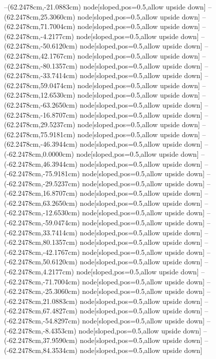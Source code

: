 --(62.2478cm,-21.0883cm) node[sloped,pos=0.5,allow upside down]{\ArrowIn}
--(62.2478cm,25.3060cm) node[sloped,pos=0.5,allow upside down]{\ArrowIn}
--(62.2478cm,71.7004cm) node[sloped,pos=0.5,allow upside down]{\ArrowIn}
--(62.2478cm,-4.2177cm) node[sloped,pos=0.5,allow upside down]{\ArrowIn}
--(62.2478cm,-50.6120cm) node[sloped,pos=0.5,allow upside down]{\ArrowIn}
--(62.2478cm,42.1767cm) node[sloped,pos=0.5,allow upside down]{\ArrowIn}
--(62.2478cm,-80.1357cm) node[sloped,pos=0.5,allow upside down]{\ArrowIn}
--(62.2478cm,-33.7414cm) node[sloped,pos=0.5,allow upside down]{\ArrowIn}
--(62.2478cm,59.0474cm) node[sloped,pos=0.5,allow upside down]{\ArrowIn}
--(62.2478cm,12.6530cm) node[sloped,pos=0.5,allow upside down]{\ArrowIn}
--(62.2478cm,-63.2650cm) node[sloped,pos=0.5,allow upside down]{\ArrowIn}
--(62.2478cm,-16.8707cm) node[sloped,pos=0.5,allow upside down]{\ArrowIn}
--(62.2478cm,29.5237cm) node[sloped,pos=0.5,allow upside down]{\ArrowIn}
--(62.2478cm,75.9181cm) node[sloped,pos=0.5,allow upside down]{\ArrowIn}
--(62.2478cm,-46.3944cm) node[sloped,pos=0.5,allow upside down]{\ArrowIn}
--(-62.2478cm,0.0000cm) node[sloped,pos=0.5,allow upside down]{\ArrowIn}
--(-62.2478cm,46.3944cm) node[sloped,pos=0.5,allow upside down]{\ArrowIn}
--(-62.2478cm,-75.9181cm) node[sloped,pos=0.5,allow upside down]{\ArrowIn}
--(-62.2478cm,-29.5237cm) node[sloped,pos=0.5,allow upside down]{\ArrowIn}
--(-62.2478cm,16.8707cm) node[sloped,pos=0.5,allow upside down]{\ArrowIn}
--(-62.2478cm,63.2650cm) node[sloped,pos=0.5,allow upside down]{\ArrowIn}
--(-62.2478cm,-12.6530cm) node[sloped,pos=0.5,allow upside down]{\ArrowIn}
--(-62.2478cm,-59.0474cm) node[sloped,pos=0.5,allow upside down]{\ArrowIn}
--(-62.2478cm,33.7414cm) node[sloped,pos=0.5,allow upside down]{\ArrowIn}
--(-62.2478cm,80.1357cm) node[sloped,pos=0.5,allow upside down]{\ArrowIn}
--(-62.2478cm,-42.1767cm) node[sloped,pos=0.5,allow upside down]{\ArrowIn}
--(-62.2478cm,50.6120cm) node[sloped,pos=0.5,allow upside down]{\ArrowIn}
--(-62.2478cm,4.2177cm) node[sloped,pos=0.5,allow upside down]{\ArrowIn}
--(-62.2478cm,-71.7004cm) node[sloped,pos=0.5,allow upside down]{\ArrowIn}
--(-62.2478cm,-25.3060cm) node[sloped,pos=0.5,allow upside down]{\ArrowIn}
--(-62.2478cm,21.0883cm) node[sloped,pos=0.5,allow upside down]{\ArrowIn}
--(-62.2478cm,67.4827cm) node[sloped,pos=0.5,allow upside down]{\ArrowIn}
--(-62.2478cm,-54.8297cm) node[sloped,pos=0.5,allow upside down]{\ArrowIn}
--(-62.2478cm,-8.4353cm) node[sloped,pos=0.5,allow upside down]{\ArrowIn}
--(-62.2478cm,37.9590cm) node[sloped,pos=0.5,allow upside down]{\ArrowIn}
--(-62.2478cm,84.3534cm) node[sloped,pos=0.5,allow upside down]{\ArrowIn}
